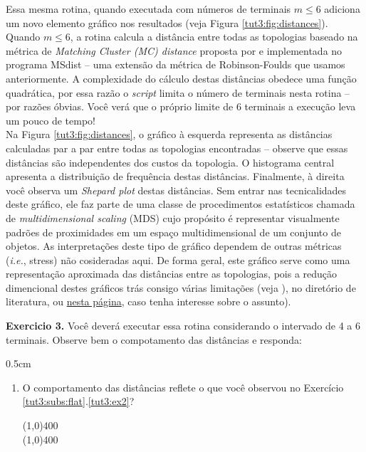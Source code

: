 \begin{refsection}
	Essa mesma rotina, quando executada com números de terminais $m \leq 6$	adiciona um novo elemento gráfico nos resultados (veja Figura \ref{tut3:fig:distances}). Quando $m \leq 6$, a rotina calcula a distância entre todas as topologias baseado na métrica de \textit{Matching Cluster (MC) distance} proposta por \textcite{BogdanowiczETGiaro_2013} e implementada no programa MSdist -- uma extensão da métrica de Robinson-Foulds \parencite{Robinson_and_Foulds_1981} que usamos anteriormente. A complexidade do cálculo destas distâncias obedece uma função quadrática, por essa razão o \textit{script} limita o número de terminais nesta rotina -- por razões óbvias. Você verá que o próprio limite de 6 terminais a execução leva um pouco de tempo!\\

	Na Figura \ref{tut3:fig:distances}, o gráfico à esquerda representa as distâncias calculadas par a par entre todas as topologias encontradas -- observe que essas distâncias são independentes dos custos da topologia. O histograma central apresenta a distribuição de frequência destas distâncias. Finalmente, à direita você observa um \textit{Shepard plot} destas distâncias. Sem entrar nas tecnicalidades deste gráfico, ele faz parte de uma classe de procedimentos estatísticos chamada de \textit{multidimensional scaling} (MDS) cujo propósito é representar visualmente padrões de proximidades em um espaço multidimensional de um conjunto de objetos. As interpretações deste tipo de gráfico dependem de outras métricas (\textit{i.e.}, stress) não cosideradas aqui. De forma geral, este gráfico serve como uma representação aproximada das distâncias entre as topologias, pois a redução dimencional destes gráficos trás consigo várias limitações (veja \cite{Berlund_2011}), no diretório de literatura, ou \href{http://www.analytictech.com/borgatti/mds.htm}{nesta página}, caso tenha interesse sobre o assunto).\\


\begin{blackBlock}{\textbf{Exercicio 3.}}\label{tut3:ex:3.\arabic{ex}}
	Você deverá executar essa rotina considerando o intervado de 4 a 6 terminais. Observe bem o compotamento das distâncias e responda:
\begin {myindentpar}{0.5cm}
\begin{enumerate}[\itshape i.]
 \item{O comportamento das distâncias reflete o que você observou no Exercício \ref{tut3:subs:flat}.\ref{tut3:ex2}?}\label{tut3:ex4}\\
  \begin{center}
  \line(1,0){400}\\
  \line(1,0){400}\\
  \end{center}


\end{enumerate}
\end{myindentpar}
\end{blackBlock}
\end{refsection}
